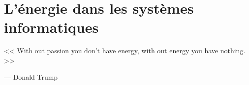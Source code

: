 \chapter{L'énergie dans les systèmes informatiques}
\label{chap3}

\epigraph{<< With out passion you don't have energy, with out energy you have nothing. >>}{--- \textup{Donald Trump}}

\NoChapterPrefix \NoChapterNumberInRef {\hypersetup{linkcolor=black} \minitoc}

\makeatletter
\renewcommand{\thefigure}{\ifnum \c@section>\z@ \thechapter.\fi
 \@arabic\c@figure}
\makeatother

\makeatletter
\renewcommand{\thetable}{\ifnum \c@section>\z@ \thechapter.\fi
 \@arabic\c@table}
\makeatother

\makeatletter
\renewcommand{\theequation}{\ifnum \c@section>\z@ \thechapter.\fi
 \@arabic\c@equation}
\makeatother


\newpage


